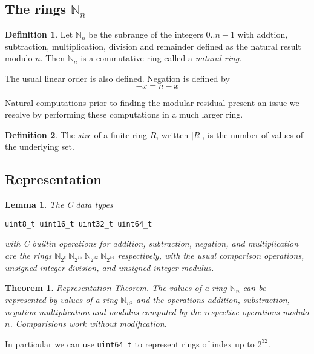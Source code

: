 \documentclass[oneside]{book}
\theoremstyle{plain}
\theoremstyle{definition}
\newtheorem{definition}{Definition}
\theoremstyle{plain}
\newtheorem{lemma}{Lemma}
\newtheorem{theorem}{Theorem}
\begin{document}
\subsection{The rings $\mathbb{N}_n$}
\begin{definition}
Let $\mathbb{N}_n$ be the subrange of the integers $0..n-1$ with 
addtion, subtraction, 
multiplication, division and remainder defined as the natural result modulo $n$.
Then $\mathbb{N}_n$ is a commutative ring called a {\em natural ring}.
\end{definition}

The usual linear order is also defined.  Negation is defined by
$$-x = n - x$$

Natural computations prior to finding the modular residual present an issue
we resolve by performing these computations in a much larger ring.

\begin{definition}
The {\em size} of a finite ring $R$, written $|R|$, is the number of values of the underlying set.
\end{definition}
\subsection{Representation}
\begin{lemma} The C data types
\begin{verbatim}
uint8_t uint16_t uint32_t uint64_t
\end{verbatim}
with C builtin operations for addition, subtraction, negation, and multiplication
are the rings
\(\mathbb{N}_{2^8}\ \mathbb{N}_{2^{16}}\ \mathbb{N}_{2^{32}}\ \mathbb{N}_{2^{64}} \)
respectively, with the usual comparison operations, unsigned integer division,
and unsigned integer modulus.
\end{lemma}

\begin{theorem}
{\em Representation Theorem}. The values of a ring $\mathbb{N}_n$ can be represented
by values of a ring $\mathbb{N}_{n^2}$ and the operations addition, substraction, negation
multiplication and modulus computed by the respective operations modulo $n$. Comparisions
work without modification.
\end{theorem}
In particular we can use \verb$uint64_t$ to represent rings of index up to 
$2^{32}$.
\end{document}
